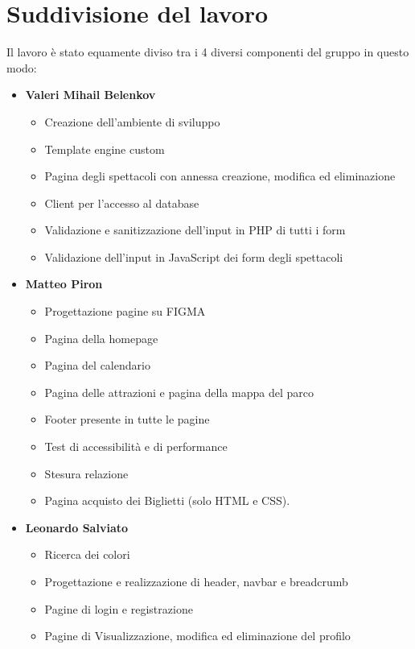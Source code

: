\section{Suddivisione del lavoro}
Il lavoro è stato equamente diviso tra i 4 diversi componenti del gruppo in questo modo:

\begin{itemize}
    \item \textbf{Valeri Mihail Belenkov}
        \begin{itemize}
            \item Creazione dell'ambiente di sviluppo 
            \item Template engine custom
            \item Pagina degli spettacoli con annessa creazione, modifica ed eliminazione
            \item Client per l'accesso al database
            \item Validazione e sanitizzazione dell'input in PHP di tutti i form
            \item Validazione dell'input in JavaScript dei form degli spettacoli
        \end{itemize}
    \item \textbf{Matteo Piron}
        \begin{itemize}
            \item Progettazione pagine su FIGMA
            \item Pagina della homepage
            \item Pagina del calendario
            \item Pagina delle attrazioni e pagina della mappa del parco
            \item Footer presente in tutte le pagine
            \item Test di accessibilità e di performance
            \item Stesura relazione
            \item Pagina acquisto dei Biglietti (solo HTML e CSS).
        \end{itemize}
    \item \textbf{Leonardo Salviato}
        \begin{itemize}
            \item Ricerca dei colori
            \item Progettazione e realizzazione di header, navbar e breadcrumb
            \item Pagine di login e registrazione
            \item Pagine di Visualizzazione, modifica ed eliminazione del profilo

\end{itemize}
\end{itemize}

